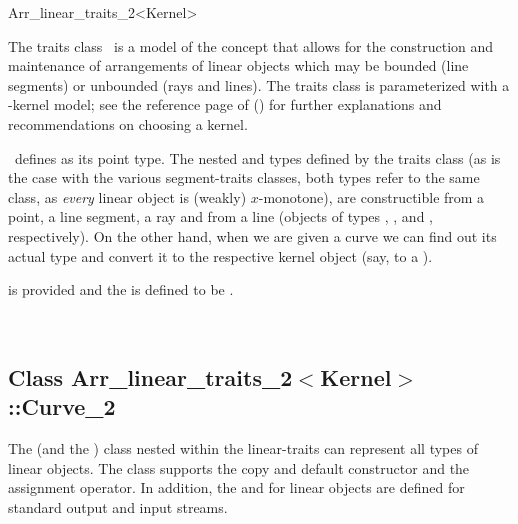 
\ccRefPageBegin

\begin{ccRefClass}{Arr_linear_traits_2<Kernel>}
    
\ccDefinition 

The traits class \ccRefName\ is a model of the 
concept that allows for the construction and maintenance of arrangements of
linear objects which may be bounded (line segments) or unbounded (rays
and lines). The traits class is parameterized with a \cgal-kernel model;
see the reference page of 
() for further explanations
and recommendations on choosing a kernel.

\ccRefName\ defines  as its point type. The nested
 and  types defined by the traits class
(as is the case with the various segment-traits classes, both types
refer to the same class, as {\sl every} linear object is (weakly) $x$-monotone),
are constructible from a point, a line segment, a ray and from a line
(objects of types , ,
 and , respectively). On the other
hand, when we are given a curve we can find out its actual type and convert
it to the respective kernel object (say, to a ).

 is provided and the 
is defined to be .

 
\ccIsModel
     \\

\subsection*{Class 
        Arr\_linear\_traits\_2$<$Kernel$>$::Curve\_2}

The  (and the ) class nested within
the linear-traits can represent all types of linear objects. The class
supports the copy and default constructor and the assignment operator.
In addition, the  and  for linear objects
are defined for standard output and input streams.


\end{ccRefClass}
